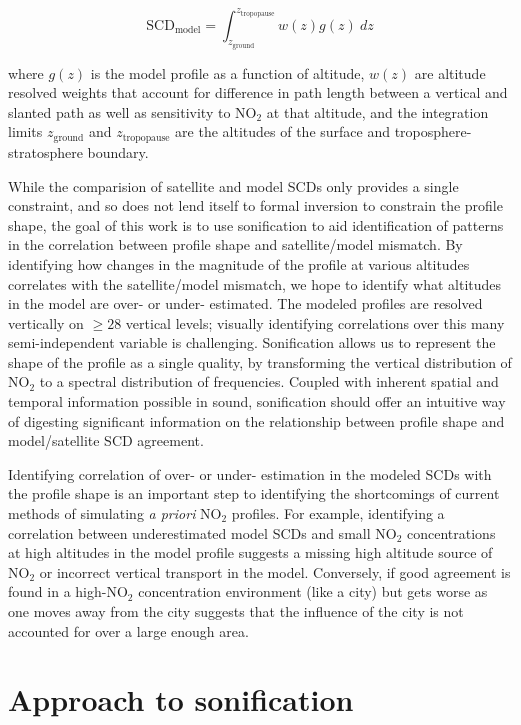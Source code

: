 \documentclass[a4paper,10pt,oneside]{article}
\newcommand{\ce}[1]{$\mathrm{#1}$}
\begin{document}
\begin{sloppy}
\begin{equation}
\mathrm{SCD_{model}} = \int_{z_{\mathrm{ground}}}^{z_{\mathrm{tropopause}}} w(z) g(z) \: dz
\label{eqn:scd-model}
\end{equation}

where $g(z)$ is the model profile as a function of altitude, $w(z)$ are altitude resolved weights that account for difference in path length between a vertical and slanted path as well as sensitivity to \ce{NO_2} at that altitude, and the integration limits $z_{\mathrm{ground}}$ and $z_{\mathrm{tropopause}}$ are the altitudes of the surface and troposphere-stratosphere boundary.

	While the comparision of satellite and model SCDs only provides a single constraint, and so does not lend itself to formal inversion to constrain the profile shape, the goal of this work is to use sonification to aid identification of patterns in the correlation between profile shape and satellite/model mismatch. By identifying how changes in the magnitude of the profile at various altitudes correlates with the satellite/model mismatch, we hope to identify what altitudes in the model are over- or under- estimated. The modeled profiles are resolved vertically on $\geq 28$ vertical levels; visually identifying correlations over this many semi-independent variable is challenging. Sonification allows us to represent the shape of the profile as a single quality, by transforming the vertical distribution of \ce{NO_2} to a spectral distribution of frequencies. Coupled with inherent spatial and temporal information possible in sound, sonification should offer an intuitive way of digesting significant information on the relationship between profile shape and model/satellite SCD agreement.

	Identifying correlation of over- or under- estimation in the modeled SCDs with the profile shape is an important step to identifying the shortcomings of current methods of simulating \emph{a priori} \ce{NO_2} profiles.  For example, identifying a correlation between underestimated model SCDs and small \ce{NO_2} concentrations at high altitudes in the model profile suggests a missing high altitude source of \ce{NO_2} or incorrect vertical transport in the model. Conversely, if good agreement is found in a high-\ce{NO_2} concentration environment (like a city) but gets worse as one moves away from the city suggests that the influence of the city is not accounted for over a large enough area.
	
\section{Approach to sonification}

\end{sloppy}
\end{document}
